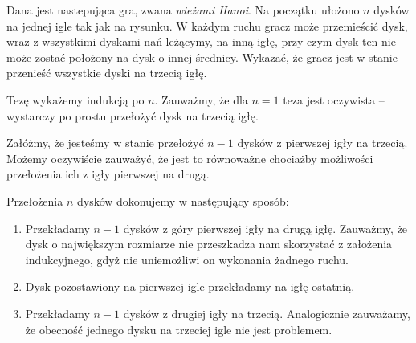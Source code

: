 \begin{problem}{3}
Dana jest nastepująca gra, zwana \textit{wieżami Hanoi}. Na początku ułożono $n$ dysków na jednej igle tak jak na rysunku. W każdym ruchu gracz może przemieścić dysk, wraz z wszystkimi dyskami nań leżącymy, na inną igłę, przy czym dysk ten nie może zostać położony na dysk o innej średnicy. Wykazać, że gracz jest w stanie przenieść wszystkie dyski na trzecią igłę.

\begin{center}

\end{center}

\end{problem}

\noindent
Tezę wykażemy indukcją po $n$. Zauważmy, że dla $n = 1$ teza jest oczywista -- wystarczy po prostu przełożyć dysk na trzecią igłę.

Załóżmy, że jesteśmy w stanie przełożyć $n - 1$ dysków z pierwszej igły na trzecią. Możemy oczywiście zauważyć, że jest to równoważne chociażby możliwości przełożenia ich z igły pierwszej na drugą.

Przełożenia $n$ dysków dokonujemy w następujący sposób:

\begin{enumerate}
	\item Przekładamy $n - 1$ dysków z góry pierwszej igły na drugą igłę. Zauważmy, że dysk o największym rozmiarze nie przeszkadza nam skorzystać z założenia indukcyjnego, gdyż nie uniemożliwi on wykonania żadnego ruchu.

	\item Dysk pozostawiony na pierwszej igle przekładamy na igłę ostatnią.

	\item Przekładamy $n - 1$ dysków z drugiej igły na trzecią. Analogicznie zauważamy, że obecność jednego dysku na trzeciej igle nie jest problemem.
\end{enumerate}

